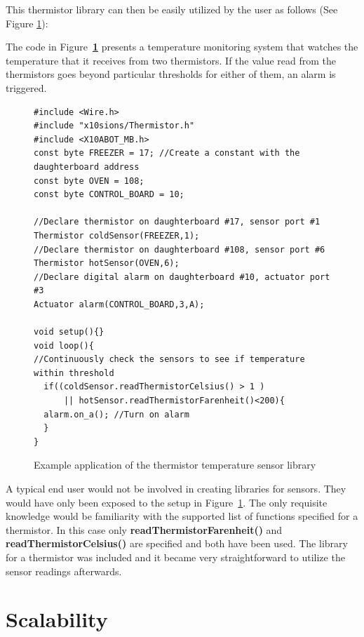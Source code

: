 This thermistor library can then be easily utilized by the user as follows (See Figure \ref{code:thermcode}):

The code in Figure~\textbf{\ref{code:thermcode}} presents a temperature monitoring system that watches the temperature that it receives from two thermistors. If the value read from the thermistors goes beyond particular thresholds for either of them, an alarm is triggered.
\begin{figure}
		\footnotesize
        {\fontsize{8}{6}\selectfont
		
		\begin{verbatim}
#include <Wire.h>  
#include "x10sions/Thermistor.h"
#include <X10ABOT_MB.h>
const byte FREEZER = 17; //Create a constant with the daughterboard address
const byte OVEN = 108;
const byte CONTROL_BOARD = 10;

//Declare thermistor on daughterboard #17, sensor port #1
Thermistor coldSensor(FREEZER,1);
//Declare thermistor on daughterboard #108, sensor port #6
Thermistor hotSensor(OVEN,6);
//Declare digital alarm on daughterboard #10, actuator port #3
Actuator alarm(CONTROL_BOARD,3,A);

void setup(){}
void loop(){
//Continuously check the sensors to see if temperature within threshold
  if((coldSensor.readThermistorCelsius() > 1 )
      || hotSensor.readThermistorFarenheit()<200){
  alarm.on_a(); //Turn on alarm 
  }
}
	\end{verbatim}
		}
    \caption{Example application of the thermistor temperature sensor library} \label{code:thermcode}
\end{figure}

A typical end user would not be involved in creating libraries for sensors. They would have only been exposed to the setup in Figure~\ref{code:thermcode}. The only requisite knowledge would be familiarity with the supported list of functions specified for a thermistor. In this case only \textbf{readThermistorFarenheit()} and  \textbf{readThermistorCelsius()} are specified and both have been used.
The library for a thermistor was included and it became very straightforward to utilize the sensor readings afterwards.
\newpage
\section{Scalability} %
\label{sec:scalability}

